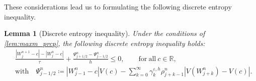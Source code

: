 \documentclass[10pt]{amsart}
\theoremstyle{plain}
\newtheorem{lemma}{Lemma}[section]
\theoremstyle{definition}
\numberwithin{equation}{section}
\newcommand{\eps}{{\varepsilon}}
\begin{document}
These considerations lead us to formulating the following discrete entropy inequality.


\begin{lemma}[Discrete entropy inequality]\label{lm:discrete-entropy-2}
Under the conditions of \cref{lem:maxm_prcp}, the following discrete entropy inequality holds:
\begin{align}\label{eq:discrete-entropy-2}
    &\frac{|W_j^{n+1}-c| -|W_j^n-c|}{\tau} + \frac{\Psi_{j+1/2}^n - \Psi_{j-1/2}^n}{h} \leq 0, \qquad \mathrm{for\ all}\  c\in\mathbb{R}, \\
    \label{eq:entropy-flux-2} &\mathrm{with} \quad \Psi_{j-1/2}^n \coloneqq |W_{j-1}^n-c|V(c) - \sum_{k=0}^\infty \gamma_k^{\eps,h} \rho_{j+k-1}^n \left|V(W_{j+k}^n)-V(c)\right|.
\end{align}
\end{lemma}
\end{document}
